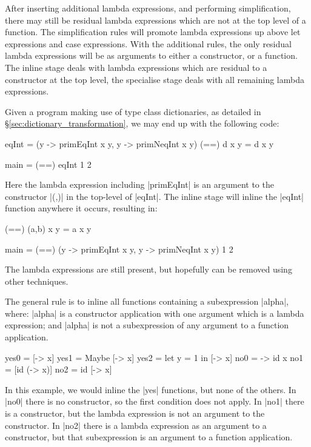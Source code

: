 \documentclass[preprint]{sigplanconf}
\begin{document}
After inserting additional lambda expressions, and performing simplification, there may still be residual lambda expressions which are not at the top level of a function. The simplification rules will promote lambda expressions up above let expressions and case expressions. With the additional rules, the only residual lambda expressions will be as arguments to either a constructor, or a function. The inline stage deals with lambda expressions which are residual to a constructor at the top level, the specialise stage deals with all remaining lambda expressions.

\begin{example}
Given a program making use of type class dictionaries, as detailed in \S\ref{sec:dictionary_transformation}, we may end up with the following code:

\begin{code}
eqInt = (\x y -> primEqInt x y, \x y -> primNeqInt x y)
(==) d x y = d x y

main = (==) eqInt 1 2
\end{code}

Here the lambda expression including |primEqInt| is an argument to the constructor |(,)| in the top-level of |eqInt|. The inline stage will inline the |eqInt| function anywhere it occurs, resulting in:

\begin{code}
(==) (a,b) x y = a x y

main = (==) (\x y -> primEqInt x y, \x y -> primNeqInt x y) 1 2
\end{code}

The lambda expressions are still present, but hopefully can be removed using other techniques.
\end{example}

The general rule is to inline all functions containing a subexpression |alpha|, where: |alpha| is a constructor application with one argument which is a lambda expression; and |alpha| is not a subexpression of any argument to a function application.

\begin{example}
\begin{code}
yes0 = [\x -> x]
yes1 = Maybe [\x -> x]
yes2 = let y = 1 in [\x -> x]
no0 = \x -> id x
no1 = [id (\x -> x)]
no2 = id [\x -> x]
\end{code}

In this example, we would inline the |yes| functions, but none of the others. In |no0| there is no constructor, so the first condition does not apply. In |no1| there is a constructor, but the lambda expression is not an argument to the constructor. In |no2| there is a lambda expression as an argument to a constructor, but that subexpression is an argument to a function application.
\end{example}
\end{document}
